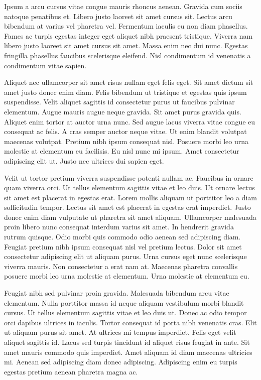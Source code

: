 \documentclass[11pt,a4paper]{article}
\begin{document}
Ipsum a arcu cursus vitae congue mauris rhoncus aenean. Gravida cum sociis natoque penatibus et. Libero justo laoreet sit amet cursus sit. Lectus arcu bibendum at varius vel pharetra vel. Fermentum iaculis eu non diam phasellus. Fames ac turpis egestas integer eget aliquet nibh praesent tristique. Viverra nam libero justo laoreet sit amet cursus sit amet. Massa enim nec dui nunc. Egestas fringilla phasellus faucibus scelerisque eleifend. Nisl condimentum id venenatis a condimentum vitae sapien.

Aliquet nec ullamcorper sit amet risus nullam eget felis eget. Sit amet dictum sit amet justo donec enim diam. Felis bibendum ut tristique et egestas quis ipsum suspendisse. Velit aliquet sagittis id consectetur purus ut faucibus pulvinar elementum. Augue mauris augue neque gravida. Sit amet purus gravida quis. Aliquet enim tortor at auctor urna nunc. Sed augue lacus viverra vitae congue eu consequat ac felis. A cras semper auctor neque vitae. Ut enim blandit volutpat maecenas volutpat. Pretium nibh ipsum consequat nisl. Posuere morbi leo urna molestie at elementum eu facilisis. Eu nisl nunc mi ipsum. Amet consectetur adipiscing elit ut. Justo nec ultrices dui sapien eget.

Velit ut tortor pretium viverra suspendisse potenti nullam ac. Faucibus in ornare quam viverra orci. Ut tellus elementum sagittis vitae et leo duis. Ut ornare lectus sit amet est placerat in egestas erat. Lorem mollis aliquam ut porttitor leo a diam sollicitudin tempor. Lectus sit amet est placerat in egestas erat imperdiet. Justo donec enim diam vulputate ut pharetra sit amet aliquam. Ullamcorper malesuada proin libero nunc consequat interdum varius sit amet. In hendrerit gravida rutrum quisque. Odio morbi quis commodo odio aenean sed adipiscing diam. Feugiat pretium nibh ipsum consequat nisl vel pretium lectus. Dolor sit amet consectetur adipiscing elit ut aliquam purus. Urna cursus eget nunc scelerisque viverra mauris. Non consectetur a erat nam at. Maecenas pharetra convallis posuere morbi leo urna molestie at elementum. Urna molestie at elementum eu.

Feugiat nibh sed pulvinar proin gravida. Malesuada bibendum arcu vitae elementum. Nulla porttitor massa id neque aliquam vestibulum morbi blandit cursus. Ut tellus elementum sagittis vitae et leo duis ut. Donec ac odio tempor orci dapibus ultrices in iaculis. Tortor consequat id porta nibh venenatis cras. Elit ut aliquam purus sit amet. At ultrices mi tempus imperdiet. Felis eget velit aliquet sagittis id. Lacus sed turpis tincidunt id aliquet risus feugiat in ante. Sit amet mauris commodo quis imperdiet. Amet aliquam id diam maecenas ultricies mi. Aenean sed adipiscing diam donec adipiscing. Adipiscing enim eu turpis egestas pretium aenean pharetra magna ac.
\end{document}
